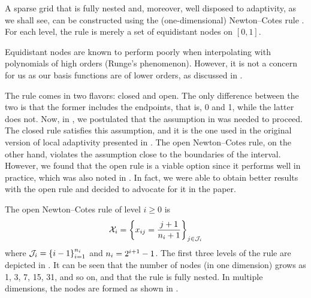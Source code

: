 A sparse grid that is fully nested and, moreover, well disposed to adaptivity,
as we shall see, can be constructed using the (one-dimensional) Newton--Cotes
rule \cite{ma2009}. For each level, the rule is merely a set of equidistant
nodes on $[0, 1]$.

\begin{remark}
Equidistant nodes are known to perform poorly when interpolating with
polynomials of high orders (Runge's phenomenon). However, it is not a concern
for us as our basis functions are of lower orders, as discussed in
.
\end{remark}

The rule comes in two flavors: closed and open. The only difference between the
two is that the former includes the endpoints, that is, 0 and 1, while the
latter does not. Now, in , we postulated that the
assumption in  was needed to proceed. The closed rule
satisfies this assumption, and it is the one used in the original version of
local adaptivity presented in \cite{ma2009}. The open Newton--Cotes rule, on the
other hand, violates the assumption close to the boundaries of the interval.
However, we found that the open rule is a viable option since it performs well
in practice, which was also noted in \cite{klimke2006}. In fact, we were able to
obtain better results with the open rule and decided to advocate for it in the
paper.


The open Newton--Cotes rule of level $i \geq 0$ is
\begin{equation} \elab{newton-cotes-grid}
  \X_i = \left\{ x_{ij} = \frac{j + 1}{\n_i + 1} \right\}_{j \in \oindex_i}
\end{equation}
where $\mathcal{J}_i = \left\{ i - 1 \right\}_{i = 1}^{n_i}$ and $n_i = 2^{i + 1}
- 1$. The first three levels of the rule are depicted in . It can be
seen that the number of nodes (in one dimension) grows as 1, 3, 7, 15, 31, and
so on, and that the rule is fully nested. In multiple dimensions, the nodes are
formed as shown in .

